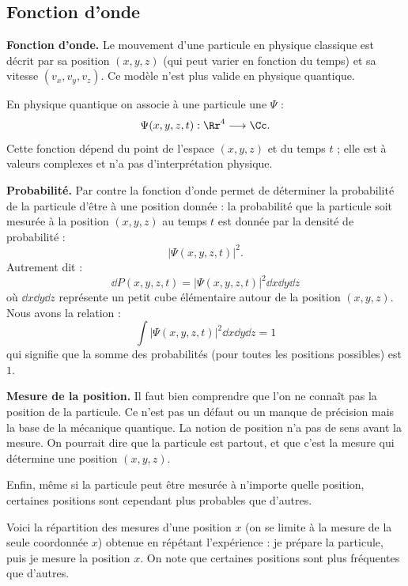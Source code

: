 \documentclass[11pt,class=report,crop=false]{standalone}
\begin{document}
\subsection{Fonction d'onde}

\textbf{Fonction d'onde.}
Le mouvement d'une particule en physique classique est décrit par sa position $(x,y,z)$ (qui peut varier en fonction du temps) et sa vitesse $(v_x,v_y,v_z)$. Ce modèle n'est plus valide en physique quantique.

En physique quantique on associe à une particule une  $\Psi$ :
$$\Psi(x,y,z,t) : \Rr^4 \longrightarrow \Cc.$$
Cette fonction dépend du point de l'espace $(x,y,z)$ et du temps $t$ ; elle est à valeurs complexes et n'a pas d'interprétation physique.

\bigskip

\textbf{Probabilité.}
Par contre la fonction d'onde permet de déterminer la probabilité de la particule d'être à une position donnée : la probabilité que la particule soit mesurée à la position $(x,y,z)$ au temps $t$ est donnée par la densité de probabilité :
$$\left| \Psi(x,y,z,t) \right|^2.$$
Autrement dit :
$$\dd P(x,y,z,t) = \left| \Psi(x,y,z,t) \right|^2 \dd x \dd y \dd z$$
où $\dd x \dd y \dd z$ représente un petit cube élémentaire autour de la position $(x,y,z)$.
Nous avons la relation :
$$\int \left| \Psi(x,y,z,t) \right|^2 \dd x \dd y \dd z = 1$$
qui signifie que la somme des probabilités (pour toutes les positions possibles) est $1$.

\bigskip

\textbf{Mesure de la position.}
Il faut bien comprendre que l'on ne connaît pas la position de la particule. Ce n'est pas un défaut ou un manque de précision mais la base de la mécanique quantique. 
La notion de position n'a pas de sens avant la mesure. On pourrait dire que la particule est \og{}partout\fg{}, et que c'est la mesure qui détermine une position $(x,y,z)$. 

Enfin, même si la particule peut être mesurée à n'importe quelle position, certaines positions sont cependant plus probables que d'autres.

Voici la répartition des mesures d'une position $x$ (on se limite à la mesure de la seule coordonnée $x$) obtenue en répétant l'expérience : je prépare la particule, puis je mesure la position $x$. On note que certaines positions sont plus fréquentes que d'autres.
\end{document}
